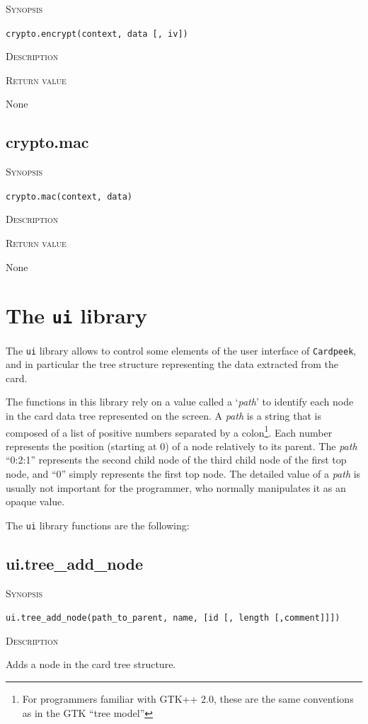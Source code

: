 \documentclass[11pt]{report}
\newcommand{\mansection}[1]{\vspace{0.5em}\par\noindent\textsc{#1}\vspace{0.5em}\par}
\newcommand{\syn}[1]{\texttt{#1}}
\begin{document}
\mansection{Synopsis}
\syn{crypto.encrypt(context, data [, iv])}

\mansection{Description}

\mansection{Return value}
  None

\subsection{crypto.mac}

\mansection{Synopsis}
\syn{crypto.mac(context, data)}

\mansection{Description}

\mansection{Return value}
  None


\section{The \syn{ui} library}

The \syn{ui} library allows to control some elements of the user interface of 
\texttt{Cardpeek}, and in particular the tree structure representing the data 
extracted from the card.

The functions in this library rely on a value called a `\emph{path}' to identify 
each node in the card data tree represented on the screen.
A \emph{path} is a string that is composed of a list of positive numbers separated 
by a colon\footnote{For programmers familiar with GTK++ 2.0, these are the same 
conventions as in the GTK ``tree model''}. 
Each number represents the position (starting at 0) of a node relatively to its parent.
The \emph{path} ``0:2:1'' represents the second child node of the third child 
node of the first top node, and ``0'' simply represents the first top node.
The detailed value of a \emph{path} is usually not important for the programmer, 
who normally manipulates it as an opaque value. 

The \syn{ui} library functions are the following:


\subsection{ui.tree\_add\_node}

\mansection{Synopsis}
\syn{ui.tree\_add\_node(path\_to\_parent, name, [\syn{id} [, \syn{length} [,\syn{comment}]]])}

\mansection{Description}
  Adds a node in the card tree structure. 
\end{document}
